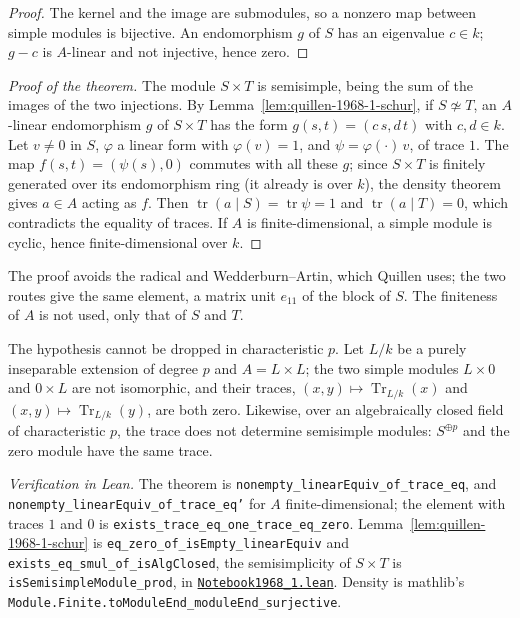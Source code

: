 \begin{proof}
The kernel and the image are submodules, so a nonzero map between simple modules is bijective. An endomorphism $g$ of $S$ has an eigenvalue $c \in k$; $g - c$ is $A$-linear and not injective, hence zero.
\end{proof}

\begin{proof}[Proof of the theorem]
The module $S \times T$ is semisimple, being the sum of the images of the two injections. By Lemma~\ref{lem:quillen-1968-1-schur}, if $S \not\simeq T$, an $A$-linear endomorphism $g$ of $S \times T$ has the form $g(s, t) = (c\,s, d\,t)$ with $c, d \in k$. Let $v \neq 0$ in $S$, $\varphi$ a linear form with $\varphi(v) = 1$, and $\psi = \varphi(\cdot)\,v$, of trace $1$. The map $f(s, t) = (\psi(s), 0)$ commutes with all these $g$; since $S \times T$ is finitely generated over its endomorphism ring (it already is over $k$), the density theorem gives $a \in A$ acting as $f$. Then $\operatorname{tr}(a \mid S) = \operatorname{tr}\psi = 1$ and $\operatorname{tr}(a \mid T) = 0$, which contradicts the equality of traces. If $A$ is finite-dimensional, a simple module is cyclic, hence finite-dimensional over $k$.
\end{proof}

\begin{remarque}
The proof avoids the radical and Wedderburn--Artin, which Quillen uses; the two routes give the same element, a matrix unit $e_{11}$ of the block of $S$. The finiteness of $A$ is not used, only that of $S$ and $T$.
\end{remarque}

\begin{contrexemple}
The hypothesis  cannot be dropped in characteristic $p$. Let $L/k$ be a purely inseparable extension of degree $p$ and $A = L \times L$; the two simple modules $L \times 0$ and $0 \times L$ are not isomorphic, and their traces, $(x, y) \mapsto \operatorname{Tr}_{L/k}(x)$ and $(x, y) \mapsto \operatorname{Tr}_{L/k}(y)$, are both zero. Likewise, over an algebraically closed field of characteristic $p$, the trace does not determine semisimple modules: $S^{\oplus p}$ and the zero module have the same trace.
\end{contrexemple}

\begin{sloppypar}
\noindent\emph{Verification in Lean.} The theorem is \texttt{nonempty\_linearEquiv\_of\_trace\_eq}, and \texttt{nonempty\_linearEquiv\_of\_trace\_eq'} for $A$ finite-dimensional; the element with traces $1$ and $0$ is \texttt{exists\_trace\_eq\_one\_trace\_eq\_zero}. Lemma~\ref{lem:quillen-1968-1-schur} is \texttt{eq\_zero\_of\_isEmpty\_linearEquiv} and \texttt{exists\_eq\_smul\_of\_isAlgClosed}, the semisimplicity of $S \times T$ is \texttt{isSemisimpleModule\_prod}, in \href{\leanblobmain/Notebook1968_1.lean}{\texttt{Notebook1968\_1.\allowbreak{}lean}}. Density is mathlib's \texttt{Module.Finite.toModuleEnd\_moduleEnd\_surjective}.
\end{sloppypar}

